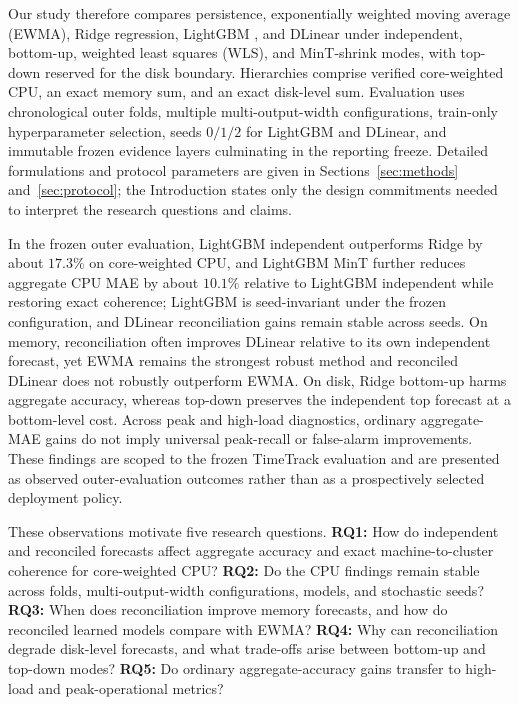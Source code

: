 \documentclass[a4paper,fleqn]{cas-dc}
\begin{document}
Our study therefore compares persistence, exponentially weighted moving average
({EWMA}), Ridge regression, LightGBM
\cite{ke2017lightgbm},
and DLinear
\cite{zeng2023dlinear}
under independent, bottom-up, weighted least squares ({WLS}), and MinT-shrink
modes, with top-down reserved for the disk boundary.
Hierarchies comprise verified core-weighted {CPU}, an exact memory sum, and an
exact disk-level sum.
Evaluation uses chronological outer folds, multiple multi-output-width
configurations, train-only
hyperparameter selection, seeds $0/1/2$ for LightGBM and DLinear, and immutable
frozen evidence layers culminating in the reporting freeze.
Detailed formulations and protocol parameters are given in
Sections~\ref{sec:methods} and~\ref{sec:protocol}; the Introduction states only
the design commitments needed to interpret the research questions and claims.

In the frozen outer evaluation, LightGBM independent outperforms Ridge by about
$17.3\%$ on core-weighted {CPU}, and LightGBM MinT further reduces aggregate
{CPU} {MAE} by about $10.1\%$ relative to LightGBM independent while restoring
exact coherence; LightGBM is seed-invariant under the frozen configuration, and
DLinear reconciliation gains remain stable across seeds.
On memory, reconciliation often improves DLinear relative to its own independent
forecast, yet {EWMA} remains the strongest robust method and reconciled DLinear
does not robustly outperform {EWMA}.
On disk, Ridge bottom-up harms aggregate accuracy, whereas top-down preserves
the independent top forecast at a bottom-level cost.
Across peak and high-load diagnostics, ordinary aggregate-{MAE} gains do not
imply universal peak-recall or false-alarm improvements.
These findings are scoped to the frozen TimeTrack evaluation and are presented
as observed outer-evaluation outcomes rather than as a prospectively selected
deployment policy.

These observations motivate five research questions.
\textbf{RQ1:} How do independent and reconciled forecasts affect aggregate
accuracy and exact machine-to-cluster coherence for core-weighted {CPU}?
\textbf{RQ2:} Do the {CPU} findings remain stable across folds, multi-output-width
configurations, models, and stochastic seeds?
\textbf{RQ3:} When does reconciliation improve memory forecasts, and how do
reconciled learned models compare with {EWMA}?
\textbf{RQ4:} Why can reconciliation degrade disk-level forecasts, and what
trade-offs arise between bottom-up and top-down modes?
\textbf{RQ5:} Do ordinary aggregate-accuracy gains transfer to high-load and
peak-operational metrics?
\end{document}

